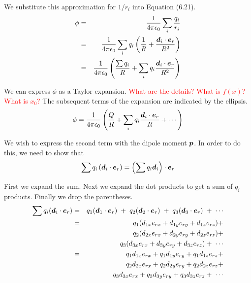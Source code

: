 We substitute this approximation for $1/r_i$ into Equation (6.21).
\begin{eqnarray*}
  \phi &=& \frac{1}{4\pi\epsilon_0} \sum_i \frac{q_i}{r_i} \\
  &=& \frac{1}{4\pi\epsilon_0} \sum_i q_i
  \left(\frac{1}{R} + \frac{\boldsymbol{d}_i \cdot \boldsymbol{e}_r}{R^2}\right) \\
  &=& \frac{1}{4\pi\epsilon_0} \left( \frac{\sum q_i}{R}
   + \sum_i q_i \frac{\boldsymbol{d}_i\cdot\boldsymbol{e}_r}{R^2} \right)
\end{eqnarray*}

We can express $\phi$ as a Taylor expansion.
\textcolor{red}{What are the details? What is $f(x)$? What is $x_0$?}
The subsequent terms of the expansion are indicated by the ellipsis.
\begin{equation}
  \phi = \frac{1}{4\pi\epsilon_0} \left( \frac{Q}{R}
  + \sum_i q_i \frac{\boldsymbol{d}_i \cdot \boldsymbol{e}_r}{R} + \cdots \right)
\end{equation}

We wish to express the second term with the dipole moment $\boldsymbol{p}$.
In order to do this, we need to show that
\begin{equation*}
  \sum q_i \left( \boldsymbol{d}_i \cdot \boldsymbol{e}_r \right)
  = \left( \sum q_i \boldsymbol{d}_i \right) \cdot \boldsymbol{e}_r
\end{equation*}

First we expand the sum.
Next we expand the dot products to get a sum of $q_i$ products.
Finally we drop the parentheses.
\begin{eqnarray*}
  \sum q_i ( \boldsymbol{d}_i \cdot \boldsymbol{e}_r )
  &=& q_1(\boldsymbol{d}_1\cdot\boldsymbol{e}_r) \;+\;
      q_2(\boldsymbol{d}_2\cdot\boldsymbol{e}_r) \;+\;
      q_3(\boldsymbol{d}_3\cdot\boldsymbol{e}_r) \;+\; \cdots \\
  &=& q_1 ( d_{1x}e_{rx} + d_{1y}e_{ry} + d_{1z}e_{rz} ) + \\
  & & q_2 ( d_{2x}e_{rx} + d_{2y}e_{ry} + d_{2z}e_{rz} ) + \\
  & & q_3 ( d_{3x}e_{rx} + d_{3y}e_{ry} + d_{3z}e_{rz} ) + \;\cdots \\
  &=& q_1d_{1x}e_{rx} + q_1d_{1y}e_{ry} + q_1d_{1z}e_{rz} + \\
  & & q_2d_{2x}e_{rx} + q_2d_{2y}e_{ry} + q_2d_{2z}e_{rz} + \\
  & & q_3d_{3x}e_{rx} + q_3d_{3y}e_{ry} + q_3d_{3z}e_{rz} + \;\cdots
\end{eqnarray*}

